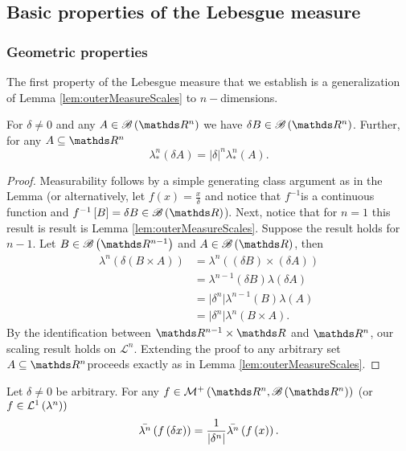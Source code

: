 \subsection{Basic properties of the Lebesgue measure\label{subsec:lebesgueRNproperties}}

\subsubsection{Geometric properties}

The first property of the Lebesgue measure that we establish is a
generalization of Lemma \ref{lem:outerMeasureScales} to $n-$dimensions.
\begin{prop}
\label{prop:outerMeasureScalesNDim}For $\delta\neq0$ and any $A\in\borel\left(\R^{n}\right)$
we have $\delta B\in\borel\left(\R^{n}\right)$. Further, for any
$A\subseteq\R^{n}$
\[
\lambda_{*}^{n}\left(\delta A\right)=\lvert\delta\rvert^{n}\lambda_{*}^{n}\left(A\right).
\]
\end{prop}

\begin{proof}
Measurability follows by a simple generating class argument as in
the Lemma (or alternatively, let $f\left(x\right)=\frac{x}{\delta}$
and notice that $f^{-1}$is a continuous function and $f^{-1}\left[B\right]=\delta B\in\borel\left(\R\right)$).
Next, notice that for $n=1$ this result is result is Lemma \ref{lem:outerMeasureScales}.
Suppose the result holds for $n-1$. Let $B\in\borel\left(\R^{n-1}\right)$
and $A\in\borel\left(\R\right)$, then 
\begin{align*}
\lambda^{n}\left(\delta\left(B\times A\right)\right) & =\lambda^{n}\left(\left(\delta B\right)\times\left(\delta A\right)\right)\\
 & =\lambda^{n-1}\left(\delta B\right)\lambda\left(\delta A\right)\\
 & =\lvert\delta^{n}\rvert\lambda^{n-1}\left(B\right)\lambda\left(A\right)\\
 & =\lvert\delta^{n}\rvert\lambda^{n}\left(B\times A\right).
\end{align*}
By the identification between $\R^{n-1}\times\R$ and $\R^{n}$, our
scaling result holds on $\mathcal{L}^{n}$. Extending the proof to
any arbitrary set $A\subseteq\R^{n}$proceeds exactly as in Lemma
\ref{lem:outerMeasureScales}.
\end{proof}
\begin{cor}
\label{cor:dilationIntegral}Let $\delta\neq0$ be arbitrary. For
any $f\in\mathcal{M}^{+}\left(\R^{n},\borel\left(\R^{n}\right)\right)$
(or $f\in\mathcal{L}^{1}\left(\lambda^{n}\right))$
\[
\bar{\lambda^{n}}\left(f\left(\delta x\right)\right)=\frac{1}{\lvert\delta^{n}\rvert}\bar{\lambda^{n}}\left(f\left(x\right)\right).
\]
\end{cor}

